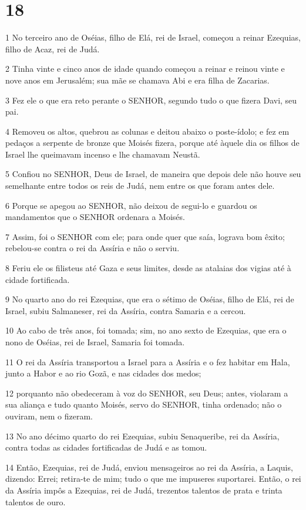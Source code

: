 \chapter{18}

\par 1 No terceiro ano de Oséias, filho de Elá, rei de Israel, começou a reinar Ezequias, filho de Acaz, rei de Judá.
\par 2 Tinha vinte e cinco anos de idade quando começou a reinar e reinou vinte e nove anos em Jerusalém; sua mãe se chamava Abi e era filha de Zacarias.
\par 3 Fez ele o que era reto perante o SENHOR, segundo tudo o que fizera Davi, seu pai.
\par 4 Removeu os altos, quebrou as colunas e deitou abaixo o poste-ídolo; e fez em pedaços a serpente de bronze que Moisés fizera, porque até àquele dia os filhos de Israel lhe queimavam incenso e lhe chamavam Neustã.
\par 5 Confiou no SENHOR, Deus de Israel, de maneira que depois dele não houve seu semelhante entre todos os reis de Judá, nem entre os que foram antes dele.
\par 6 Porque se apegou ao SENHOR, não deixou de segui-lo e guardou os mandamentos que o SENHOR ordenara a Moisés.
\par 7 Assim, foi o SENHOR com ele; para onde quer que saía, lograva bom êxito; rebelou-se contra o rei da Assíria e não o serviu.
\par 8 Feriu ele os filisteus até Gaza e seus limites, desde as atalaias dos vigias até à cidade fortificada.
\par 9 No quarto ano do rei Ezequias, que era o sétimo de Oséias, filho de Elá, rei de Israel, subiu Salmaneser, rei da Assíria, contra Samaria e a cercou.
\par 10 Ao cabo de três anos, foi tomada; sim, no ano sexto de Ezequias, que era o nono de Oséias, rei de Israel, Samaria foi tomada.
\par 11 O rei da Assíria transportou a Israel para a Assíria e o fez habitar em Hala, junto a Habor e ao rio Gozã, e nas cidades dos medos;
\par 12 porquanto não obedeceram à voz do SENHOR, seu Deus; antes, violaram a sua aliança e tudo quanto Moisés, servo do SENHOR, tinha ordenado; não o ouviram, nem o fizeram.
\par 13 No ano décimo quarto do rei Ezequias, subiu Senaqueribe, rei da Assíria, contra todas as cidades fortificadas de Judá e as tomou.
\par 14 Então, Ezequias, rei de Judá, enviou mensageiros ao rei da Assíria, a Laquis, dizendo: Errei; retira-te de mim; tudo o que me impuseres suportarei. Então, o rei da Assíria impôs a Ezequias, rei de Judá, trezentos talentos de prata e trinta talentos de ouro.
